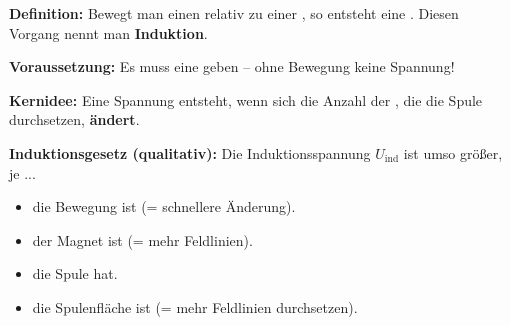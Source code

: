 \documentclass[11pt,a4paper]{article}
\newcommand{\luecke}[1]{\underline{\hspace{#1}}}
\begin{document}
\begin{merkebox}[title=Kasten 3: Merksatz -- Elektromagnetische Induktion]
\small
\textbf{Definition:} Bewegt man einen \luecke{2.5cm} relativ zu einer \luecke{2.5cm}, so entsteht eine \luecke{3.5cm}. Diesen Vorgang nennt man \textbf{Induktion}.

\vspace{0.3em}
\textbf{Voraussetzung:} Es muss eine \luecke{2.5cm} geben -- ohne Bewegung keine Spannung!

\vspace{0.3em}
\textbf{Kernidee:} Eine Spannung entsteht, wenn sich die Anzahl der \luecke{2.5cm}, die die Spule durchsetzen, \textbf{ändert}.

\vspace{0.3em}
\textbf{Induktionsgesetz (qualitativ):} Die Induktionsspannung $U_{\text{ind}}$ ist umso größer, je ...
\begin{itemize}[leftmargin=1.2cm, itemsep=0pt, topsep=2pt]
    \item[$\triangleright$] \luecke{2.5cm} die Bewegung ist (= schnellere Änderung).
    \item[$\triangleright$] \luecke{2.5cm} der Magnet ist (= mehr Feldlinien).
    \item[$\triangleright$] \luecke{2.5cm} die Spule hat.
    \item[$\triangleright$] \luecke{2.5cm} die Spulenfläche ist (= mehr Feldlinien durchsetzen).
\end{itemize}
\end{merkebox}

\newpage
\end{document}
